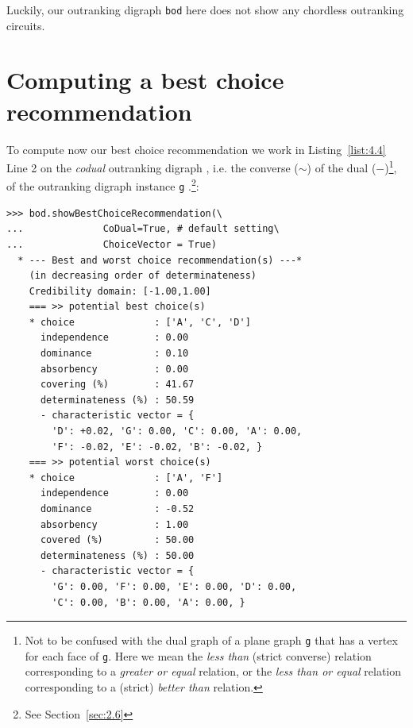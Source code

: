 Luckily, our outranking digraph \texttt{bod} here does not show any chordless outranking circuits.

\section{Computing a best choice recommendation}
\label{sec:4.5}

To compute now our \Rubis best choice recommendation we work in Listing~\vref{list:4.4} Line 2 on the \emph{codual} outranking digraph , i.e. the converse ($\sim$) of the dual ($-$)\footnote{Not to be confused with the dual graph of a plane graph \texttt{g} that has a vertex for each face of \texttt{g}. Here we mean the \emph{less than} (strict converse) relation corresponding to a \emph{greater or equal} relation, or the \emph{less than or equal} relation corresponding to a (strict) \emph{better than} relation.}, of the outranking digraph instance \texttt{g} \citep{BIS-2013}.\footnote{See Section~\ref{sec:2.6}}:
\begin{lstlisting}[caption={Computing the best choice recommendation},label=list:4.4]
>>> bod.showBestChoiceRecommendation(\
...              CoDual=True, # default setting\
...              ChoiceVector = True)   
  * --- Best and worst choice recommendation(s) ---*
    (in decreasing order of determinateness)   
    Credibility domain: [-1.00,1.00]
    === >> potential best choice(s)
    * choice              : ['A', 'C', 'D']
      independence        : 0.00
      dominance           : 0.10
      absorbency          : 0.00
      covering (%)        : 41.67
      determinateness (%) : 50.59
      - characteristic vector = {
        'D': +0.02, 'G': 0.00, 'C': 0.00, 'A': 0.00,
        'F': -0.02, 'E': -0.02, 'B': -0.02, }
    === >> potential worst choice(s) 
    * choice              : ['A', 'F']
      independence        : 0.00
      dominance           : -0.52
      absorbency          : 1.00
      covered (%)         : 50.00
      determinateness (%) : 50.00
      - characteristic vector = {
        'G': 0.00, 'F': 0.00, 'E': 0.00, 'D': 0.00,
        'C': 0.00, 'B': 0.00, 'A': 0.00, }
\end{lstlisting}				  

